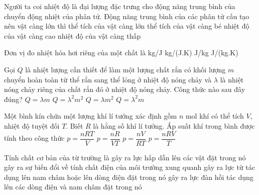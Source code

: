	\begin{ex}%
		Người ta coi nhiệt độ là đại lượng đặc trưng cho động năng trung bình của chuyển động nhiệt của phân tử. Động năng trung bình của các phân tử cấu tạo nên vật càng lớn thì
		\choice
		{thể tích của vật càng lớn}
		{thể tích của vật càng bé}
		{\True nhiệt độ của vật càng cao}
		{nhiệt độ của vật càng thấp}
	\end{ex}

	\begin{ex}%
		Đơn vị đo nhiệt hóa hơi riêng của một chất là
		\choice
		{kg/J}
		{kg/(J.K)}
		{\True J/kg}
		{J/(kg.K)}
	\end{ex}

	\begin{ex}%
		Gọi $Q$ là nhiệt lượng cần thiết để làm một lượng chất rắn có khối lượng $m$ chuyển hoàn toàn từ thể rắn sang thể lỏng ở nhiệt độ nóng chảy và $\lambda$ là nhiệt nóng chảy riêng của chất rắn đó ở nhiệt độ nóng chảy. Công thức nào sau đây đúng?
		\choice
		{\True $Q=\lambda m$}
		{$Q=\lambda^2m^2$}
		{$Q=\lambda m^2$}
		{$Q=\lambda^2m$}
	\end{ex}

	\begin{ex}%
		Một bình kín chứa một lượng khí lí tưởng xác định gồm $n$ mol khí có thể tích $V$, nhiệt độ tuyệt đối $T$. Biết $R$ là hằng số khí lí tưởng. Áp suất khí trong bình được tính theo công thức
		\choice
		{\True $p=\dfrac{nRT}{V}$}
		{$p=\dfrac{nR}{VT}$}
		{$p=\dfrac{nV}{RT}$}
		{$p=\dfrac{nRV}{T}$}
	\end{ex}

	\begin{ex}%
		Tính chất cơ bản của từ trường là
		\choice
		{gây ra lực hấp dẫn lên các vật đặt trong nó}
		{gây ra sự biến đổi về tính chất điện của môi trường xung quanh}
		{\True gây ra lực từ tác dụng lên nam châm hoặc lên dòng điện đặt trong nó}
		{gây ra lực đàn hồi tác dụng lên các dòng điện và nam châm đặt trong nó}
	\end{ex}

